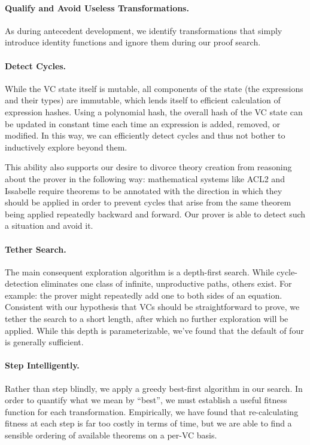 \paragraph{Qualify and Avoid Useless Transformations.}  As during antecedent development, we identify transformations that simply introduce identity functions and ignore them during our proof search.

\paragraph{Detect Cycles.}  While the VC state itself is mutable, all components of the state (the expressions and their types) are immutable, which lends itself to efficient calculation of expression hashes.  Using a polynomial hash, the overall hash of the VC state can be updated in constant time each time an expression is added, removed, or modified.  In this way, we can efficiently detect cycles and thus not bother to inductively explore beyond them.

This ability also supports our desire to divorce theory creation from reasoning about the prover in the following way: mathematical systems like ACL2\cite{kaufmannACL2} and Issabelle\cite{wenzelIsar} require theorems to be annotated with the direction in which they should be applied in order to prevent cycles that arise from the same theorem being applied repeatedly backward and forward.  Our prover is able to detect such a situation and avoid it.

\paragraph{Tether Search.}  The main consequent exploration algorithm is a depth-first search.  While cycle-detection eliminates one class of infinite, unproductive paths, others exist.  For example: the prover might repeatedly add one to both sides of an equation.  Consistent with our hypothesis that VCs should be straightforward to prove, we tether the search to a short length, after which no further exploration will be applied.  While this depth is parameterizable, we've found that the default of four is generally sufficient.

\paragraph{Step Intelligently.}  Rather than step blindly, we apply a greedy best-first algorithm in our search.  In order to quantify what we mean by ``best'', we must establish a useful fitness function for each transformation.  Empirically, we have found that re-calculating fitness at each step is far too costly in terms of time, but we are able to find a sensible ordering of available theorems on a per-VC basis.

